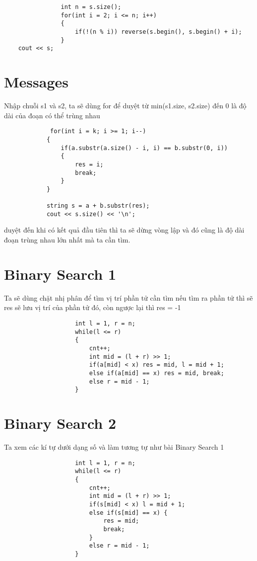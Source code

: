 \documentclass{article}
\begin{document}
\begin{verbatim}
                int n = s.size();
                for(int i = 2; i <= n; i++)
                {
                    if(!(n % i)) reverse(s.begin(), s.begin() + i);
                }
    cout << s;
\end{verbatim}

\section*{Messages}
Nhập chuỗi s1 và s2, ta sẽ dùng for để duyệt từ min(s1.size, s2.size) đến 0 là độ dài của đoạn có thể trùng nhau
\begin{verbatim}
             for(int i = k; i >= 1; i--)
            {
                if(a.substr(a.size() - i, i) == b.substr(0, i))
                {
                    res = i;
                    break;
                }
            }
        
            string s = a + b.substr(res);
            cout << s.size() << '\n';
\end{verbatim}
duyệt đến khi có kết quả đầu tiên thì ta sẽ dừng vòng lập và đó cũng là độ dài đoạn trùng nhau lớn nhất mà ta cần tìm.

\section*{Binary Search 1}
Ta sẽ dùng chặt nhị phân để tìm vị trí phần tử cần tìm nếu tìm ra phần tử thì sẽ res sẽ lưu vị trí của phần tử đó, còn ngược lại thì res = -1 \\

\begin{verbatim}
                    int l = 1, r = n;
                    while(l <= r)
                    { 
                        cnt++;
                        int mid = (l + r) >> 1;
                        if(a[mid] < x) res = mid, l = mid + 1;
                        else if(a[mid] == x) res = mid, break;
                        else r = mid - 1;  
                    }

\end{verbatim}

\section*{Binary Search 2}
 Ta xem các kí tự dưới dạng số và làm tương tự như bài Binary Search 1

 \begin{verbatim}
                    int l = 1, r = n;    
                    while(l <= r)
                    {
                        cnt++;
                        int mid = (l + r) >> 1;
                        if(s[mid] < x) l = mid + 1;
                        else if(s[mid] == x) {
                            res = mid;
                            break;
                        }
                        else r = mid - 1;
                    }

\end{verbatim}
\end{document}
